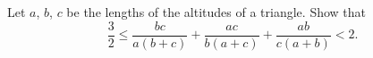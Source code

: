 Let $a$, $b$, $c$ be the lengths of the altitudes of a triangle. Show that
\[
\frac{3}{2} \leq \frac{bc}{a(b+c)} + \frac{ac}{b(a+c)} + \frac{ab}{c(a+b)} < 2.
\]
